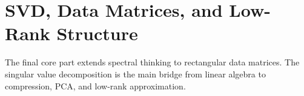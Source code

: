 \part{SVD, Data Matrices, and Low-Rank Structure}

The final core part extends spectral thinking to rectangular data matrices.
The singular value decomposition is the main bridge from linear algebra to
compression, PCA, and low-rank approximation.
